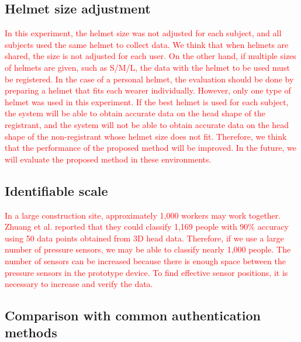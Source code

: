 \documentclass[english,preprint,JIP]{ipsj}
\begin{document}
\subsection{Helmet size adjustment}
\label{sec:helmet_size_adjustment}

\textcolor{red}{In this experiment, the helmet size was not adjusted for each subject, and all subjects used the same helmet to collect data. We think that when helmets are shared, the size is not adjusted for each user. On the other hand, if multiple sizes of helmets are given, such as S/M/L, the data with the helmet to be used must be registered. In the case of a personal helmet, the evaluation should be done by preparing a helmet that fits each wearer individually. However, only one type of helmet was used in this experiment. If the best helmet is used for each subject, the system will be able to obtain accurate data on the head shape of the registrant, and the system will not be able to obtain accurate data on the head shape of the non-registrant whose helmet size does not fit. Therefore, we think that the performance of the proposed method will be improved. In the future, we will evaluate the proposed method in these environments.}


\subsection{Identifiable scale}
\label{sec:identifiable_scale}

\textcolor{red}{In a large construction site, approximately 1,000 workers may work together. Zhuang et al.\cite{head_shape_variations} reported that they could classify 1,169 people with 90\% accuracy using 50 data points obtained from 3D head data. Therefore, if we use a large number of pressure sensors, we may be able to classify nearly 1,000 people. The number of sensors can be increased because there is enough space between the pressure sensors in the prototype device. To find effective sensor positions, it is necessary to increase and verify the data.}


\subsection{Comparison with common authentication methods}
\label{sec:comparison_of_performance}
\end{document}
